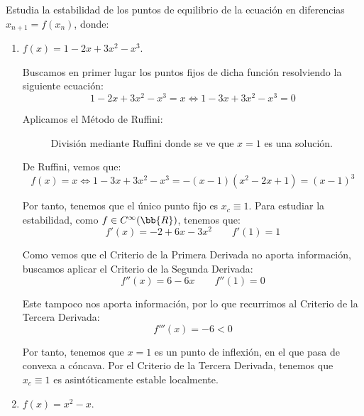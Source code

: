 \begin{ejercicio}
    Estudia la estabilidad de los puntos de equilibrio de la ecuación en diferencias $x_{n+1} = f(x_n)$, donde:
    \begin{enumerate}
        \item $f(x)=1-2x+3x^2-x^3$.

        Buscamos en primer lugar los puntos fijos de dicha función resolviendo la siguiente ecuación:
        \begin{equation*}
            1-2x+3x^2-x^3 = x \Longleftrightarrow 1-3x+3x^2-x^3 = 0
        \end{equation*}

        Aplicamos el Método de Ruffini:
        \begin{figure}[H]
            \centering
            \caption{División mediante Ruffini donde se ve que $x=1$ es una solución.}
        \end{figure}

        De Ruffini, vemos que:
        \begin{equation*}
            f(x)=x \Longleftrightarrow 1-3x+3x^2-x^3=-(x-1)(x^2-2x+1) = (x-1)^3
        \end{equation*}

        Por tanto, tenemos que el único punto fijo es $x_c\equiv 1$. Para estudiar la estabilidad, como $f\in  C^\infty(\bb{R})$, tenemos que:
        \begin{equation*}
            f'(x)=-2+6x-3x^2 \qquad f'(1)=1
        \end{equation*}

        Como vemos que el Criterio de la Primera Derivada no aporta información, buscamos aplicar el Criterio de la Segunda Derivada:
        \begin{equation*}
            f''(x)=6-6x \qquad f''(1)=0
        \end{equation*}

        Este tampoco nos aporta información, por lo que recurrimos al Criterio de la Tercera Derivada:
        \begin{equation*}
            f'''(x)=-6<0
        \end{equation*}

        Por tanto, tenemos que $x=1$ es un punto de inflexión, en el que pasa de convexa a cóncava. Por el Criterio de la Tercera Derivada, tenemos que $x_c\equiv 1$ es asintóticamente estable localmente.
    
        \item $f(x)=x^2-x$.


\end{enumerate}
\end{ejercicio}
